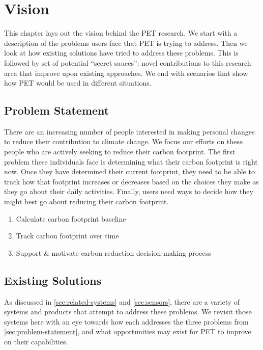 \chapter{Vision}

This chapter lays out the vision behind the PET research. We start with a description of the problems users face that PET is trying to address. Then we look at how existing solutions have tried to address these problems. This is followed by set of potential ``secret sauces'': novel contributions to this research area that improve upon existing approaches. We end with scenarios that show how PET would be used in different situations.

\section{Problem Statement}
\label{sec:problem-statement}

There are an increasing number of people interested in making personal changes to reduce their contribution to climate change. We focus our efforts on these people who are actively seeking to reduce their carbon footprint. The first problem these individuals face is determining what their carbon footprint is right now. Once they have determined their current footprint, they need to be able to track how that footprint increases or decreases based on the choices they make as they go about their daily activities. Finally, users need ways to decide how they might best go about reducing their carbon footprint.

\begin{enumerate}
	\item Calculate carbon footprint baseline
	\item Track carbon footprint over time
	\item Support \& motivate carbon reduction decision-making process
\end{enumerate}

\section{Existing Solutions}

As discussed in \autoref{sec:related-systems} and \autoref{sec:sensors}, there are a variety of systems and products that attempt to address these problems. We revisit those systems here with an eye towards how each addresses the three problems from \autoref{sec:problem-statement}, and what opportunities may exist for PET to improve on their capabilities.

